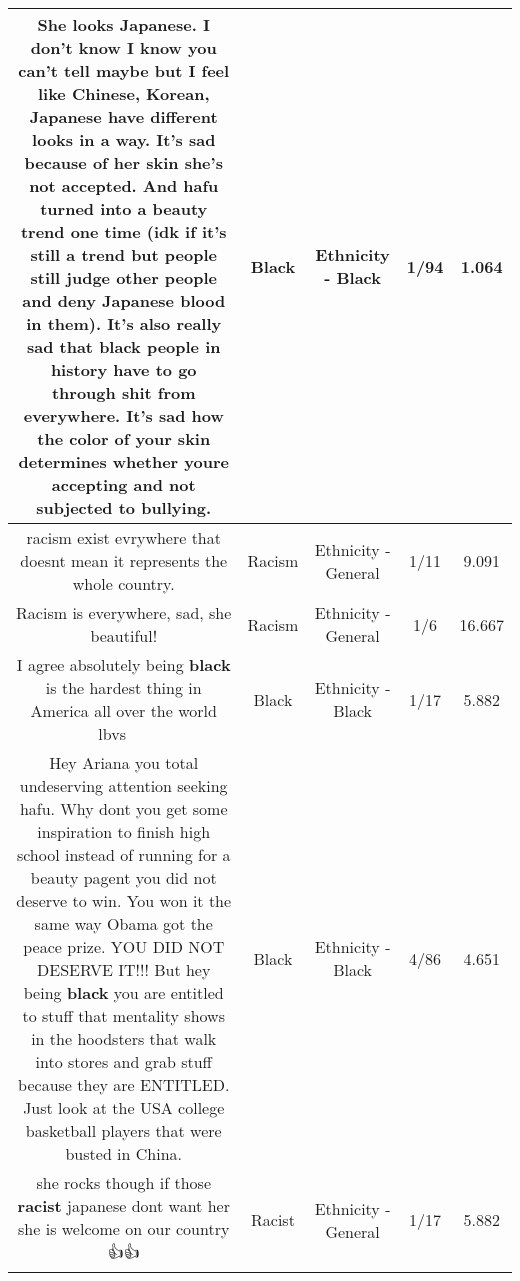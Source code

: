 \documentclass[11pt]{article}
\newlength\mylength
\begin{document}
\begin{center}
\begin{longtable}{|C{.65\mylength}|C{.30\mylength}|C{.12\mylength}|C{.12\mylength}|C{.12\mylength}|}
  \small She looks Japanese. I don't know I know you can't tell maybe but I feel like Chinese, Korean, Japanese have different looks in a way. It's sad because of her skin she's not accepted. And hafu turned into a beauty trend one time (idk if it's still a trend but people still judge other people and deny Japanese blood in them). It's also really sad that \textbf{black} people in history have to go through shit from everywhere. It's sad how the color of your skin determines whether youre accepting and not subjected to bullying.\normalsize   & Black & Ethnicity - Black & 1/94 & 1.064 \\  \hline
  \small racism exist evrywhere that doesnt mean it represents the whole country.\normalsize   & Racism & Ethnicity - General & 1/11 & 9.091 \\  \hline
  \small Racism is everywhere, sad, she beautiful!\normalsize   & Racism & Ethnicity - General & 1/6 & 16.667 \\  \hline
  \small I agree absolutely being \textbf{black} is the hardest thing in America all over the world lbvs 🤣😂💗🙏\normalsize   & Black & Ethnicity - Black & 1/17 & 5.882 \\  \hline
  \small Hey Ariana you total undeserving attention seeking hafu.  Why dont you get some inspiration to finish high school instead of running for a beauty pagent you did not deserve to win.  You won it the same way Obama got the peace prize.  YOU DID NOT DESERVE IT!!!  But hey being \textbf{black} you are entitled to stuff that mentality shows in the hoodsters that walk into stores and grab stuff because they are ENTITLED.  Just look at the USA college basketball players that were busted in China.\normalsize   & Black & Ethnicity - Black & 4/86 & 4.651 \\  \hline
  \small she rocks though if those \textbf{racist} japanese dont want her she is welcome on our country 👍👍\normalsize   & Racist & Ethnicity - General & 1/17 & 5.882 \\  \hline

\end{longtable}
\end{center}
\end{document}
